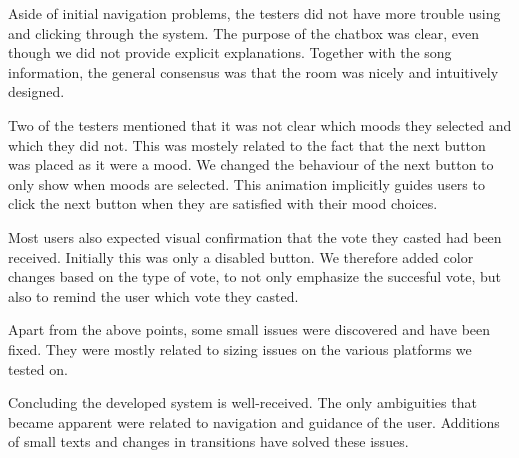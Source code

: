 Aside of initial navigation problems, the testers did not have more trouble using and clicking through the system.
The purpose of the chatbox was clear, even though we did not provide explicit explanations.
Together with the song information, the general consensus was that the room was nicely  and intuitively designed.

Two of the testers mentioned that it was not clear which moods they selected and which they did not.
This was mostely related to the fact that the next button was placed as it were a mood.
We changed the behaviour of the next button to only show when moods are selected.
This animation implicitly guides users to click the next button when they are satisfied with their mood choices.

Most users also expected visual confirmation that the vote they casted had been received.
Initially this was only a disabled button.
We therefore added color changes based on the type of vote, to not only emphasize the succesful vote, but also to remind the user which vote they casted.

Apart from the above points, some small issues were discovered and have been fixed.
They were mostly related to sizing issues on the various platforms we tested on.

Concluding the developed system is well-received.
The only ambiguities that became apparent were related to navigation and guidance of the user.
Additions of small texts and changes in transitions have solved these issues.